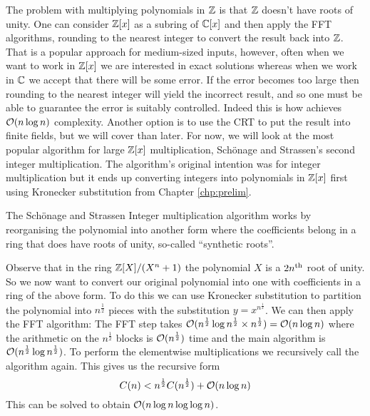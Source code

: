 The problem with multiplying polynomials in ${\mathbb Z}$ is that ${\mathbb Z}$ doesn't have roots of unity. One can consider ${\mathbb Z}[x]$ as a subring of $\mathbb{C}[x]$ and then apply the FFT algorithms, rounding to the nearest integer to convert the result back into ${\mathbb Z}$. That is a popular approach for medium-sized inputs, however, often when we want to work in ${\mathbb Z}[x]$ we are interested in exact solutions whereas when we work in $\mathbb{C}$ we accept that there will be some error. If the error becomes too large then rounding to the nearest integer will yield the incorrect result, and so one must be able to guarantee the error is suitably controlled. Indeed this is how \cite{nlogn} achieves $\mathcal O(n\log n)$ complexity. Another option is to use the CRT to put the result into finite fields, but we will cover than later. For now, we will look at the most popular algorithm for large ${\mathbb Z}[x]$ multiplication, Sch\"{o}nage and Strassen's second integer multiplication. The algorithm's original intention was for integer multiplication but it ends up converting integers into polynomials in ${\mathbb Z}[x]$ first using Kronecker substitution from Chapter \ref{chp:prelim}.

The Sch\"{o}nage and Strassen Integer multiplication algorithm works by reorganising the polynomial into another form where the coefficients belong in a ring that does have roots of unity, so-called ``synthetic roots''.


Observe that in the ring ${\mathbb Z}[X] / (X^n + 1)$ the polynomial $X$ is a $2n^{\textrm{th}}$ root of unity. So we now want to convert our original polynomial into one with coefficients in a ring of the above form. To do this we can use Kronecker substitution to partition the polynomial into $n^{\frac{1}{2}}$ pieces with the substitution $y = x^{n^{\frac{1}{2}}}$. We can then apply the FFT algorithm: The FFT step takes $\mathcal O(n^{\frac{1}{2}}\log n^{\frac{1}{2}} \times n^{\frac{1}{2}}) = \mathcal O(n \log n)$ where the arithmetic on the $n^{\frac{1}{2}}$ blocks is $\mathcal O(n^{\frac{1}{2}})$ time and the main algorithm is $\mathcal O(n^{\frac{1}{2}}\log n^{\frac{1}{2}})$. To perform the elementwise multiplications we recursively call the algorithm again. This gives us the recursive form
\[
    C(n) < n^{\frac{1}{2}}C(n^{\frac{1}{2}}) + \mathcal O(n \log n)
\]
This can be solved to obtain $\mathcal O(n \log n \log \log n)$. 


